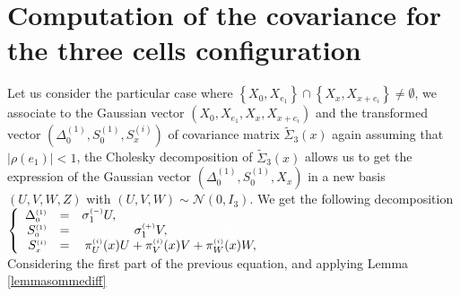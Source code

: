 \documentclass[12pt]{article}
\renewcommand{\tilde}{\widetilde}
\theoremstyle{Theorem}
\theoremstyle{definition}
\begin{document}
\section{Computation of the covariance for the three cells configuration}
Let us consider the particular case where $\left\{ X_{0}, X_{e_1}\right\} \cap \left\{ X_{x}, X_{x+e_i}\right\} \neq \emptyset $,
 we associate to the Gaussian vector $\left(X_{0}, X_{e_1}, X_{x}, X_{x+e_i} \right)$ and the transformed vector $\left(\Delta^{\scriptscriptstyle (1)}_{\scriptscriptstyle 0}, S^{\scriptscriptstyle (1)}_{\scriptscriptstyle 0}, S^{\scriptscriptstyle (i)}_{x} \right)$ of covariance matrix $\tilde{\Sigma}_{3}(x)$ again assuming that $|\rho(e_1)| < 1$, the Cholesky decomposition of $\tilde{\Sigma}_{3}(x)$ allows us to get the expression of the Gaussian vector $\left(\Delta^{\scriptscriptstyle (1)}_{\scriptscriptstyle 0},S^{\scriptscriptstyle (1)}_{\scriptscriptstyle 0},X_{x} \right)$ in a new basis $\left(U,V,W,Z\right)$ with $\left(U, V, W\right) \sim \mathcal{N}\left(0,I_{3}\right)$. We get the following decomposition \\ 
$\left\{
\begin{array}{rlc}
\Delta^{\scriptscriptstyle (1)}_{\scriptscriptstyle 0} & = & \sigma^{\scriptscriptstyle (-)}_{1}U,  \textcolor{white}{+  \pi^{\scriptscriptstyle(+, i)}_{V}(x) V +  \pi^{\scriptscriptstyle(+, i)}_{W}(x) W +  \pi^{\scriptscriptstyle(+, i)}_{Z}(x)Z, } \\
S^{\scriptscriptstyle (1)}_{\scriptscriptstyle 0} & = & \textcolor{white}{\sigma^{\scriptscriptstyle (-)}_{1}U,} \sigma^{\scriptscriptstyle (+)}_{1}V, \textcolor{white}{+  \pi^{\scriptscriptstyle(+, i)}_{W}(x) W +  \pi^{\scriptscriptstyle(+, i)}_{Z}(x)Z, } \\
S^{\scriptscriptstyle (i)}_{\scriptscriptstyle  x} & = &  \pi^{\scriptscriptstyle(i)}_{U}(x)U +  \pi^{\scriptscriptstyle(i)}_{V}(x) V +  \pi^{\scriptscriptstyle(i)}_{W}(x) W, \textcolor{white}{ + \pi^{\scriptscriptstyle(+, i)}_{Z}(x)Z, } \\
\end{array}\right.$ \\
Considering the first part of the previous equation, and applying Lemma \ref{lemmasommediff}
\end{document}
